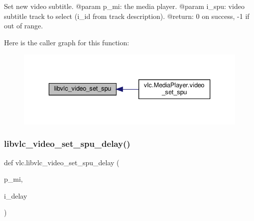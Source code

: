 \begin{DoxyVerb}Set new video subtitle.
@param p_mi: the media player.
@param i_spu: video subtitle track to select (i_id from track description).
@return: 0 on success, -1 if out of range.
\end{DoxyVerb}
 Here is the caller graph for this function\+:
\nopagebreak
\begin{figure}[H]
\begin{center}
\leavevmode
\includegraphics[width=336pt]{namespacevlc_a429c12d1cb5157663d43472108bd1eeb_icgraph}
\end{center}
\end{figure}
\mbox{\label{namespacevlc_aef6c3b516812532dbf6a1b52e3e0a9db}} 
\subsubsection{\texorpdfstring{libvlc\+\_\+video\+\_\+set\+\_\+spu\+\_\+delay()}{libvlc\_video\_set\_spu\_delay()}}
{\footnotesize\ttfamily def vlc.\+libvlc\+\_\+video\+\_\+set\+\_\+spu\+\_\+delay (\begin{DoxyParamCaption}\item[{}]{p\+\_\+mi,  }\item[{}]{i\+\_\+delay }\end{DoxyParamCaption})}

